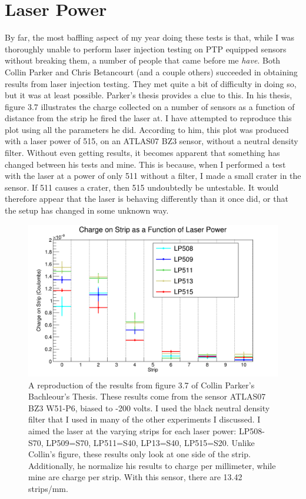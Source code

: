 \documentclass{report}
\begin{document}
        \section{Laser Power} \label{sect:laser_power}
            By far, the most baffling aspect of my year doing these tests is that, while I was thoroughly unable to perform laser injection testing on PTP equipped sensors without breaking them, a number of people that came before me \textit{have}. Both Collin Parker and Chris Betancourt (and a couple others) succeeded in obtaining results from laser injection testing. They met quite a bit of difficulty in doing so, but it was at least possible. Parker's thesis provides a clue to this. In his thesis, figure 3.7 illustrates the charge collected on a number of sensors as a function of distance from the strip he fired the laser at. I have attempted to reproduce this plot using all the parameters he did. According to him, this plot was produced with a laser power of 515, on an ATLAS07 BZ3 sensor, without a neutral density filter. Without even getting results, it becomes apparent that something has changed between his tests and mine. This is because, when I performed a test with the laser at a power of only 511 without a filter, I made a small crater in the sensor. If 511 causes a crater, then 515 undoubtedly be untestable. It would therefore appear that the laser is behaving differently than it once did, or that the setup has changed in some unknown way.

            \begin{figure}[h] 
                \includegraphics[height=.4\textheight]{charge_collection}
                \centering
                \caption{ A reproduction of the results from figure 3.7 of Collin Parker's Bachleour's Thesis. These results come from the sensor ATLAS07 BZ3 W51-P6, biased to -200 volts. I used the black neutral density filter that I used in many of the other experiments I discussed. I aimed the laser at the varying strips for each laser power: LP508-S70, LP509=S70, LP511=S40, LP13=S40, LP515=S20. Unlike Collin's figure, these results only look at one side of the strip. Additionally, he normalize his results to charge per millimeter, while mine are charge per strip. With this sensor, there are 13.42 strips/mm.}
                \label{fig:charge_collection}
            \end{figure}
\end{document}
